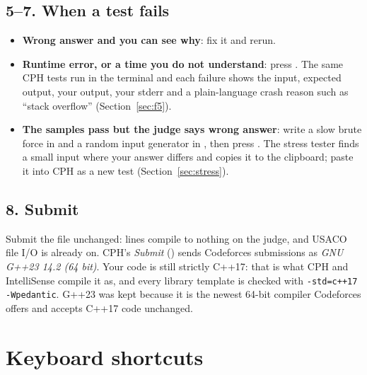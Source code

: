 \subsection{5--7. When a test fails}
\begin{itemize}
  \item \textbf{Wrong answer and you can see why}: fix it and rerun.
  \item \textbf{Runtime error, or a time you do not understand}: press . The same CPH tests run in the terminal
        and each failure shows the input, expected output, your output, your stderr and a plain-language crash
        reason such as ``stack overflow'' (Section~\ref{sec:f5}).
  \item \textbf{The samples pass but the judge says wrong answer}: write a slow brute force in 
        and a random input generator in , then press . The stress tester finds a
        small input where your answer differs and copies it to the clipboard; paste it into CPH as a new test
        (Section~\ref{sec:stress}).
\end{itemize}

\subsection{8. Submit}
Submit the file unchanged:  lines compile to nothing on the judge, and USACO file I/O is already on. CPH's
\emph{Submit} () sends Codeforces submissions as \emph{GNU G++23 14.2 (64 bit)}. Your code is still
strictly C++17: that is what CPH and IntelliSense compile it as, and every library template is checked with
\texttt{-std=c++17 -Wpedantic}. G++23 was kept because it is the newest 64-bit compiler Codeforces offers and
accepts C++17 code unchanged.

\section{Keyboard shortcuts}

